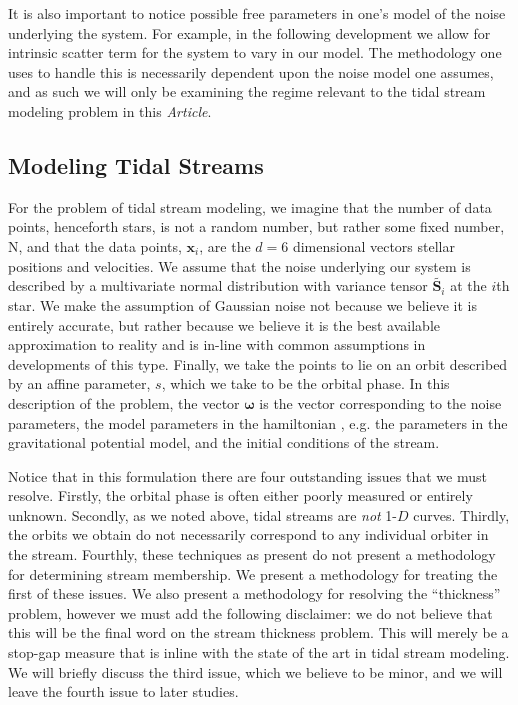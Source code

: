 \documentclass[12pt,preprint]{aastex}
\theoremstyle{plain}
\theoremstyle{definition}
\newcommand{\mtensor}[1]{\boldsymbol{#1}}
\newcommand{\mS}{\mtensor{S}}
\newcommand{\mvector}[1]{\mtensor{#1}}
\newcommand{\vx}{\mvector{x}}
\newcommand{\vomega}{\mvector{\omega}}
\newcommand{\documentname}{\textsl{Article}}
\begin{document}
It is also important to notice possible free parameters in one's model of the noise underlying the system. For example, in the following development we allow for intrinsic scatter term for the system to vary in our model. The methodology one uses to handle this is necessarily dependent upon the noise model one assumes, and as such we will only be examining the regime relevant to the tidal stream modeling problem in this \documentname. 

\subsection{Modeling Tidal Streams}
For the problem of tidal stream modeling, we imagine that the number of data points, henceforth stars, is not a random number, but rather some fixed number, N, and that the data points, $\vx_i$, are the $d = 6$ dimensional vectors stellar positions and velocities. We assume that the noise underlying our system is described by a multivariate normal distribution with variance tensor $\tilde{\mS_i}$ at the $i$th star. We make the assumption of Gaussian noise not because we believe it is entirely accurate, but rather because we believe it is the best available approximation to reality and is in-line with common assumptions in developments of this type. Finally, we take the points to lie on an orbit described by an affine parameter, $s$, which we take to be the orbital phase. In this description of the problem, the vector $\vomega$ is the vector corresponding to the noise parameters, the model parameters in the hamiltonian , e.g. the parameters in the gravitational potential model, and the initial conditions of the stream. 

Notice that in this formulation there are four outstanding issues that we must resolve. Firstly, the orbital phase is often either poorly measured or entirely unknown. Secondly, as we noted above, tidal streams are \emph{not} 1-$D$ curves. Thirdly, the orbits we obtain do not necessarily correspond to any individual orbiter in the stream. Fourthly, these techniques as present do not present a methodology for determining stream membership. We present a  methodology for treating the first of these issues. We also present a methodology for resolving the ``thickness'' problem, however we must add the following disclaimer: we do not believe that this will be the final word on the stream thickness problem. This will merely be a stop-gap measure that is inline with the state of the art in tidal stream modeling. We will briefly discuss the third issue, which we believe to be minor, and we will leave the fourth issue to later studies. 
\end{document}
